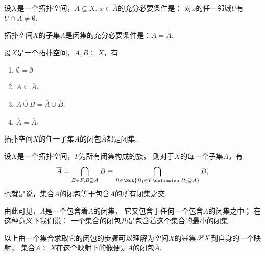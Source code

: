 \begin{property}\label{theorem:拓扑学.一点属于闭包的充分必要条件}
设\(X\)是一个拓扑空间，\(A \subseteq X\).
\(x \in \overline{A}\)的充分必要条件是：
对\(x\)的任一邻域\(U\)有\(U \cap A \neq \emptyset\).
\end{property}

\begin{theorem}\label{theorem:拓扑学.成为闭集的充分必要条件2}
拓扑空间\(X\)的子集\(A\)是闭集的充分必要条件是：\(A = \overline{A}\).
\end{theorem}

\begin{theorem}\label{theorem:拓扑学.闭包的性质}
设\(X\)是一个拓扑空间，\(A,B \subseteq X\)，有
\begin{enumerate}
	\item \(\overline{\emptyset} = \emptyset\).
	\item \(A \subseteq \overline{A}\).
	\item \(\overline{A \cup B} = \overline{A} \cup \overline{B}\).
	\item \(\overline{\overline{A}} = \overline{A}\).
\end{enumerate}
\end{theorem}

\begin{corollary}\label{theorem:拓扑学.拓扑空间子集闭包都是闭集}
拓扑空间\(X\)的任一子集\(A\)的闭包\(\overline{A}\)都是闭集.
\end{corollary}

\begin{theorem}\label{theorem:拓扑学.集合的闭包是含有该集的最小闭集}
设\(X\)是一个拓扑空间，\(F\)为所有闭集构成的族，
则对于\(X\)的每一个子集\(A\)，有\[
\overline{A}
= \bigcap_{B \in F, B \supseteq A} B
\equiv \bigcap_{B \in \Set{ B_1 \in F \given B_1 \supseteq A}} B,
\]
也就是说，集合\(A\)的闭包等于包含\(A\)的所有闭集之交.
\end{theorem}
由此可见，\(\overline{A}\)是一个包含着\(A\)的闭集，
它又包含于任何一个包含\(A\)的闭集之中；
在这种意义下我们说：
一个集合的闭包乃是包含着这个集合的最小的闭集.

以上由一个集合求取它的闭包的步骤可以理解为空间\(X\)的幂集\(\mathscr{P} X\)到自身的一个映射，
集合\(A \subseteq X\)在这个映射下的像便是\(A\)的闭包\(\overline{A}\).


